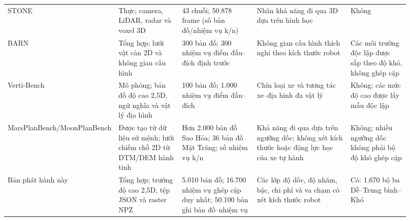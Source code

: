 \documentclass[11pt]{article}
\begin{document}
{\begin{longtable}{@{}L{0.18\linewidth} L{0.16\linewidth} L{0.19\linewidth}
                   L{0.24\linewidth} L{0.15\linewidth}@{}}
    STONE \cite{stone} & Thực; camera, LiDAR, radar và voxel 3D & 43 chuỗi; 50.878
    frame (số bản đồ/nhiệm vụ k/n) & Nhãn khả năng đi qua 3D dựa trên hình học
    & Không \\
    BARN \cite{barn} & Tổng hợp; lưới vật cản 2D và không gian cấu hình & 300 bản
    đồ; 300 nhiệm vụ điểm đầu--đích định trước & Không gian cấu hình thích nghi theo
    kích thước robot & Các môi trường độc lập được sắp theo độ khó, không ghép cặp \\
    Verti-Bench \cite{vertibench} & Mô phỏng; bản đồ độ cao 2,5D, ngữ nghĩa và
    vật lý địa hình & 100 bản đồ; 1.000 nhiệm vụ điểm đầu--đích & Chín loại xe và
    tương tác xe--địa hình đa vật lý & Không; các mức độ cao được lấy mẫu độc lập \\
    MarsPlanBench/\newline MoonPlanBench \cite{planetarypathbench} & Được tạo từ dữ liệu sứ mệnh;
    lưới chiếm chỗ 2D từ DTM/DEM hành tinh & Hơn 2.000 bản đồ Sao Hỏa; 36 bản đồ
    Mặt Trăng; số nhiệm vụ k/n & Khả năng đi qua dựa trên ngưỡng dốc; không xét
    kích thước hoặc động lực học của xe tự hành & Không; nhiều ngưỡng dốc không phải
    bộ độ khó ghép cặp \\
    Bản phát hành này & Tổng hợp; trường độ cao 2,5D, tệp JSON và raster NPZ &
    5.010 bản đồ; 16.700 nhiệm vụ ghép cặp duy nhất; 50.100 bản ghi bản đồ--nhiệm
    vụ & Các lớp độ dốc, độ nhám, bậc, chi phí và va chạm có xét kích thước robot & Có:
    1.670 bộ ba Dễ--Trung bình--Khó \\
  \end{longtable}
}
\end{document}
